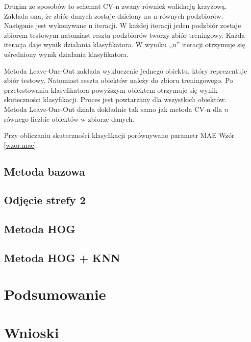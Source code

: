 \documentclass[a4paper,twoside,12pt]{book}
\begin{document}
    Drugim ze sposobów to schemat CV-n zwany również walidacją krzyżową.
    Zakłada ona, że zbiór danych zostaje dzielony na n-równych podzbiorów.
    Następnie jest wykonywane n iteracji. W każdej iteracji jeden podzbiór zostaje zbiorem testowym natomiast reszta
    podzbiorów tworzy zbiór treningowy.
    Każda iteracja daje wynik działania klasyfikatora. W wyniku ,,n'' iteracji otrzymuje się uśredniony wynik działania klasyfikatora.

    Metoda Leave-One-Out zakłada wykluczenie jednego obiektu, który reprezentuje zbiór testowy. Natomiast reszta obiektów należy do zbioru treningowego.
    Po przetestowaniu klasyfikatora powyższym obiektem otrzymuje się wynik skuteczności klasyfikacji. Proces jest powtarzany dla wszystkich obiektów.
    Metoda Leave-One-Out działa dokładnie tak samo jak metoda CV-n dla $n$ równego liczbie obiektów w zbiorze danych.

    Przy obliczaniu skuteczności klasyfikacji porównywano parametr MAE Wzór \ref{wzor.mae}.


    \subsection{Metoda bazowa}
    \subsection{Odjęcie strefy 2}
    \subsection{Metoda HOG}
    \subsection{Metoda HOG + KNN}
    \section{Podsumowanie}
    \section{Wnioski}
\end{document}
